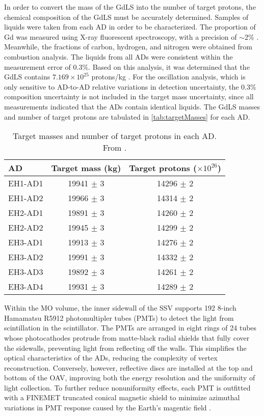 \documentclass[../thesis.tex]{subfiles}
\begin{document}
In order to convert the mass of the GdLS into the number of target protons, the chemical composition of the GdLS must be accurately determined. Samples of liquids were taken from each AD in order to be characterized. The proportion of Gd was measured using X-ray fluorescent spectroscopy, with a precision of $\sim$2\% \cite{AN2016133}. Meanwhile, the fractions of carbon, hydrogen, and nitrogen were obtained from combustion analysis. The liquids from all ADs were consistent within the measurement error of 0.3\%. Based on this analysis, it was determined that the GdLS contains $7.169 \times 10^{25}$ protons/kg \cite{Band_2013}. For the oscillation analysis, which is only sensitive to AD-to-AD relative variations in detection uncertainty, the 0.3\% composition uncertainty is not included in the target mass uncertainty, since all measurements indicated that the ADs contain identical liquids. The GdLS masses and number of target protons are tabulated in \autoref{tab:targetMasses} for each AD.

\begin{table}[h]
  \begin{tabular}{lcc}
    \toprule
    AD & Target mass (kg) & Target protons ($\times 10^{26}$) \\
    \midrule
    EH1-AD1 & 19941 $\pm$ 3 & 14296 $\pm$ 2\\
    EH1-AD2 & 19966 $\pm$ 3 & 14314 $\pm$ 2\\
    EH2-AD1 & 19891 $\pm$ 3 & 14260 $\pm$ 2\\
    EH2-AD2 & 19945 $\pm$ 3 & 14299 $\pm$ 2\\
    EH3-AD1 & 19913 $\pm$ 3 & 14276 $\pm$ 2\\
    EH3-AD2 & 19991 $\pm$ 3 & 14332 $\pm$ 2\\
    EH3-AD3 & 19892 $\pm$ 3 & 14261 $\pm$ 2\\
    EH3-AD4 & 19931 $\pm$ 3 & 14289 $\pm$ 2\\
    \bottomrule
  \end{tabular}
  \caption{Target masses and number of target protons in each AD. From \cite{An_2017}.}
  \label{tab:targetMasses}
\end{table}

Within the MO volume, the inner sidewall of the SSV supports 192 8-inch Hamamatsu R5912 photomultipler tubes (PMTs) to detect the light from scintillation in the scintillator. The PMTs are arranged in eight rings of 24 tubes whose photocathodes protrude from matte-black radial shields that fully cover the sidewalls, preventing light from reflecting off the walls. This simplifies the optical characteristics of the ADs, reducing the complexity of vertex reconstruction. Conversely, however, reflective discs are installed at the top and bottom of the OAV, improving both the energy resolution and the uniformity of light collection. To further reduce nonuniformity effects, each PMT is outfitted with a FINEMET truncated conical magnetic shield to minimize azimuthal variations in PMT response caused by the Earth's magentic field \cite{DeVore:2013xma}.
\end{document}
